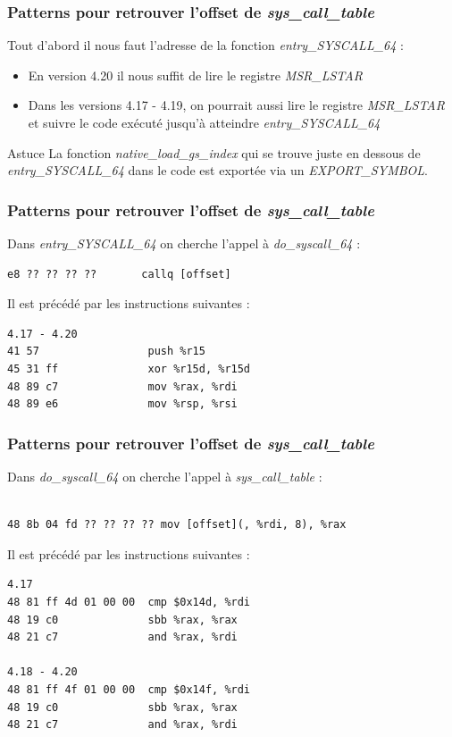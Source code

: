 \documentclass{beamer}
\begin{document}
\begin{frame}[fragile]
\frametitle{Patterns pour retrouver l'offset de \textit{sys\_call\_table}}
Tout d'abord il nous faut l'adresse de la fonction \textit{entry\_SYSCALL\_64} :
\begin{itemize}
\item 	En version 4.20 il nous suffit de lire le registre \textit{MSR\_LSTAR}
\item 	Dans les versions 4.17 - 4.19, on pourrait aussi lire le registre \textit{MSR\_LSTAR} et suivre le code exécuté jusqu'à atteindre \textit{entry\_SYSCALL\_64}
\end{itemize}
\begin{block}{Astuce}
La fonction \textit{native\_load\_gs\_index} qui se trouve juste en dessous de \textit{entry\_SYSCALL\_64} dans le code est exportée via un \textit{EXPORT\_SYMBOL}.
\end{block}
\end{frame}

\begin{frame}[fragile]
\frametitle{Patterns pour retrouver l'offset de \textit{sys\_call\_table}}
Dans \textit{entry\_SYSCALL\_64} on cherche l'appel à \textit{do\_syscall\_64} :
\begin{lstlisting}[style=CStyle]
e8 ?? ?? ?? ??       callq [offset]
\end{lstlisting}
\medskip
Il est précédé par les instructions suivantes :
\begin{lstlisting}[style=CStyle]
4.17 - 4.20
41 57                 push %r15  
45 31 ff              xor %r15d, %r15d  
48 89 c7              mov %rax, %rdi  
48 89 e6              mov %rsp, %rsi  
\end{lstlisting}
\end{frame}

\begin{frame}[fragile]
\frametitle{Patterns pour retrouver l'offset de \textit{sys\_call\_table}}
Dans \textit{do\_syscall\_64} on cherche l'appel à \textit{sys\_call\_table} :
\begin{lstlisting}[style=CStyle]

48 8b 04 fd ?? ?? ?? ?? mov [offset](, %rdi, 8), %rax
\end{lstlisting}
\medskip
Il est précédé par les instructions suivantes :
\begin{lstlisting}[style=CStyle]
4.17  
48 81 ff 4d 01 00 00  cmp $0x14d, %rdi  
48 19 c0              sbb %rax, %rax  
48 21 c7              and %rax, %rdi  

4.18 - 4.20  
48 81 ff 4f 01 00 00  cmp $0x14f, %rdi  
48 19 c0              sbb %rax, %rax  
48 21 c7              and %rax, %rdi  
\end{lstlisting}
\end{frame}
\end{document}
